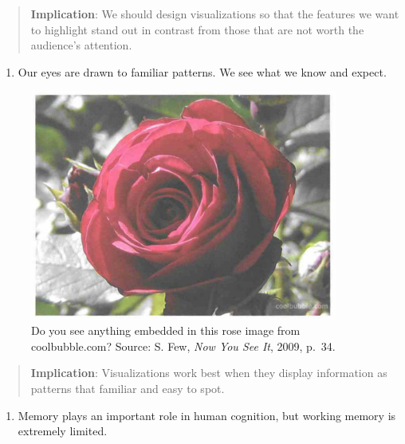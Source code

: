 \documentclass[
  letterpaper,
  DIV=11,
  numbers=noendperiod]{scrreprt}
\providecommand{\tightlist}{%
  \setlength{\itemsep}{0pt}\setlength{\parskip}{0pt}}\usepackage{longtable,booktabs,array}
\begin{document}
\begin{quote}
\textbf{Implication}: We should design visualizations so that the
features we want to highlight stand out in contrast from those that are
not worth the audience's attention.
\end{quote}

\begin{enumerate}
\def\labelenumi{\arabic{enumi}.}
\setcounter{enumi}{1}
\tightlist
\item
  Our eyes are drawn to familiar patterns. We see what we know and
  expect.
\end{enumerate}

\begin{figure}[H]

{\centering \includegraphics[width=0.9\textwidth,height=\textheight]{src/../images/rose1.png}

}

\caption{Do you see anything embedded in this rose image from
coolbubble.com? Source: S. Few, \emph{Now You See It}, 2009, p.~34.}

\end{figure}%

\begin{quote}
\textbf{Implication}: Visualizations work best when they display
information as patterns that familiar and easy to spot.
\end{quote}

\begin{enumerate}
\def\labelenumi{\arabic{enumi}.}
\setcounter{enumi}{2}
\tightlist
\item
  Memory plays an important role in human cognition, but working memory
  is extremely limited.
\end{enumerate}
\end{document}
